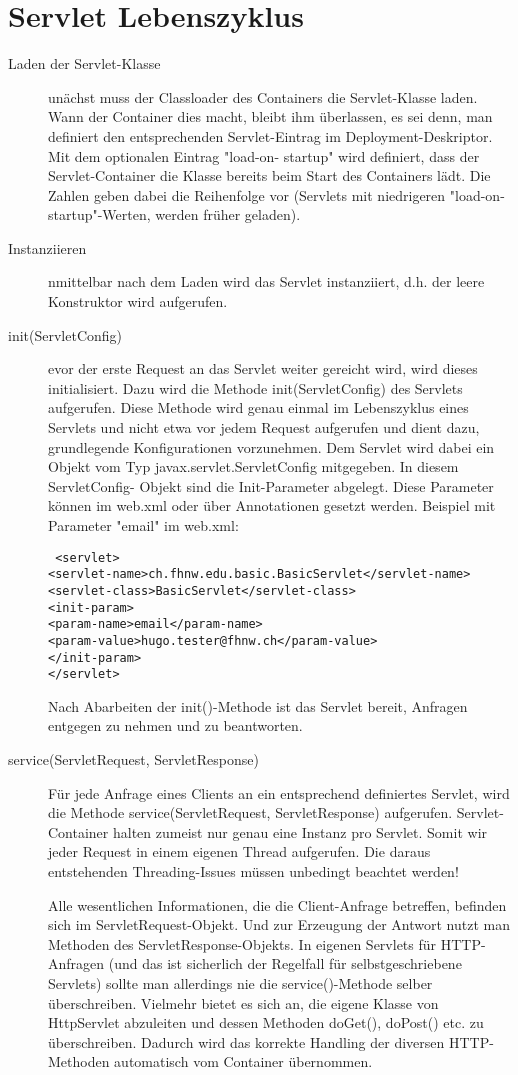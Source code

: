 \documentclass[a4paper,10pt]{scrreprt}
\begin{document}
\section{Servlet Lebenszyklus}
\begin{description}
 \item [Laden der Servlet-Klasse] unächst muss der Classloader des Containers die Servlet-Klasse
laden. Wann der Container dies macht, bleibt ihm überlassen, es sei denn, man definiert den
entsprechenden Servlet-Eintrag im Deployment-Deskriptor. Mit dem optionalen Eintrag "load-on-
startup" wird definiert, dass der Servlet-Container die Klasse bereits beim Start des Containers lädt.
Die Zahlen geben dabei die Reihenfolge vor (Servlets mit niedrigeren "load-on-startup"-Werten,
werden früher geladen).
\item[Instanziieren] nmittelbar nach dem Laden wird das Servlet instanziiert, d.h. der leere Konstruktor
wird aufgerufen.
\item [init(ServletConfig)] evor der erste Request an das Servlet weiter gereicht wird, wird dieses
initialisiert. Dazu wird die Methode init(ServletConfig) des Servlets aufgerufen. Diese
Methode wird genau einmal im Lebenszyklus eines Servlets und nicht etwa vor jedem Request
aufgerufen und dient dazu, grundlegende Konfigurationen vorzunehmen. Dem Servlet wird dabei ein
Objekt vom Typ javax.servlet.ServletConfig mitgegeben. In diesem ServletConfig-
Objekt sind die Init-Parameter abgelegt. Diese Parameter können im web.xml oder über
Annotationen gesetzt werden. Beispiel mit Parameter "email" im web.xml:
\begin{verbatim}
 <servlet>
<servlet-name>ch.fhnw.edu.basic.BasicServlet</servlet-name>
<servlet-class>BasicServlet</servlet-class>
<init-param>
<param-name>email</param-name>
<param-value>hugo.tester@fhnw.ch</param-value>
</init-param>
</servlet>
\end{verbatim}
Nach Abarbeiten der init()-Methode ist das Servlet bereit, Anfragen entgegen zu nehmen und zu
beantworten.
\item[service(ServletRequest, ServletResponse)] Für jede Anfrage eines Clients an ein entsprechend
definiertes Servlet, wird die Methode service(ServletRequest, ServletResponse)
aufgerufen. Servlet-Container halten zumeist nur genau eine Instanz pro Servlet. Somit wir jeder
Request in einem eigenen Thread aufgerufen. Die daraus entstehenden Threading-Issues müssen
unbedingt beachtet werden!

Alle wesentlichen Informationen, die die Client-Anfrage betreffen, befinden sich im
ServletRequest-Objekt. Und zur Erzeugung der Antwort nutzt man Methoden des
ServletResponse-Objekts. In eigenen Servlets für HTTP-Anfragen (und das ist sicherlich der
Regelfall für selbstgeschriebene Servlets) sollte man allerdings nie die service()-Methode selber
überschreiben. Vielmehr bietet es sich an, die eigene Klasse von HttpServlet abzuleiten und
dessen Methoden doGet(), doPost() etc. zu überschreiben. Dadurch wird das korrekte
Handling der diversen HTTP-Methoden automatisch vom Container übernommen.


\end{description}
\end{document}
